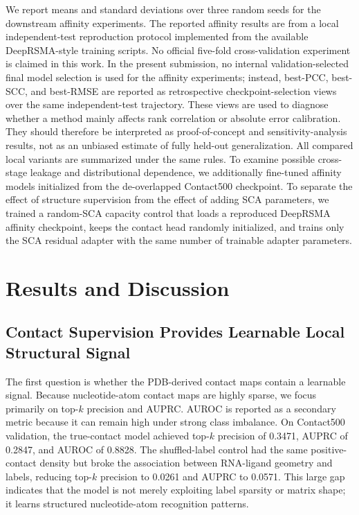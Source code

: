 \documentclass[journal=jcisd8,manuscript=article]{achemso}
\begin{document}
We report means and standard deviations over three random seeds for the downstream affinity experiments. The reported affinity results are from a local independent-test reproduction protocol implemented from the available DeepRSMA-style training scripts. No official five-fold cross-validation experiment is claimed in this work. In the present submission, no internal validation-selected final model selection is used for the affinity experiments; instead, best-PCC, best-SCC, and best-RMSE are reported as retrospective checkpoint-selection views over the same independent-test trajectory. These views are used to diagnose whether a method mainly affects rank correlation or absolute error calibration. They should therefore be interpreted as proof-of-concept and sensitivity-analysis results, not as an unbiased estimate of fully held-out generalization. All compared local variants are summarized under the same rules. To examine possible cross-stage leakage and distributional dependence, we additionally fine-tuned affinity models initialized from the de-overlapped Contact500 checkpoint. To separate the effect of structure supervision from the effect of adding SCA parameters, we trained a random-SCA capacity control that loads a reproduced DeepRSMA affinity checkpoint, keeps the contact head randomly initialized, and trains only the SCA residual adapter with the same number of trainable adapter parameters.

\section{Results and Discussion}

\subsection{Contact Supervision Provides Learnable Local Structural Signal}

The first question is whether the PDB-derived contact maps contain a learnable signal. Because nucleotide-atom contact maps are highly sparse, we focus primarily on top-$k$ precision and AUPRC. AUROC is reported as a secondary metric because it can remain high under strong class imbalance. On Contact500 validation, the true-contact model achieved top-$k$ precision of 0.3471, AUPRC of 0.2847, and AUROC of 0.8828. The shuffled-label control had the same positive-contact density but broke the association between RNA-ligand geometry and labels, reducing top-$k$ precision to 0.0261 and AUPRC to 0.0571. This large gap indicates that the model is not merely exploiting label sparsity or matrix shape; it learns structured nucleotide-atom recognition patterns.
\end{document}
